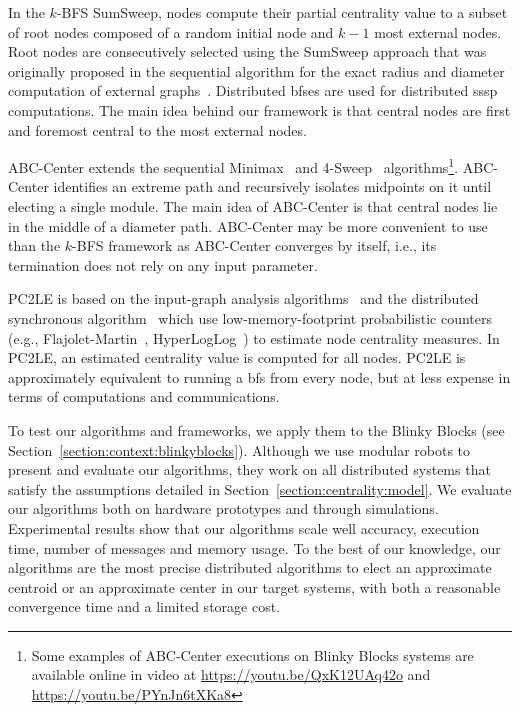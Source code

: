 In the $k$-BFS SumSweep, nodes compute their partial centrality value to a subset of root nodes composed of a random initial node and $k-1$ most external nodes. Root nodes are consecutively selected using the SumSweep approach that was originally proposed in the sequential algorithm for the exact radius and diameter computation of external graphs~\cite{borassi2014solvability}. Distributed \gls{bfses} are used for distributed \gls{sssp} computations. The main idea behind our framework is that central nodes are first and foremost central to the most external nodes. 

ABC-Center extends the sequential Minimax~\cite{handler1973minimax} and 4-Sweep~\cite{crescenzi2013computing} algorithms\footnote{Some examples of ABC-Center executions on Blinky Blocks systems are available online in video at \url{https://youtu.be/QxK12UAq42o} and \url{https://youtu.be/PYnJn6tXKa8}}. ABC-Center identifies an extreme path and recursively isolates midpoints on it until electing a single module. The main idea of ABC-Center is that central nodes lie in the middle of a diameter path. ABC-Center may be more convenient to use than the $k$-BFS framework as ABC-Center converges by itself, i.e., its termination does not rely on any input parameter.

PC2LE is based on the input-graph analysis algorithms~\cite{kang2011centralities,kang2011hadi} and the distributed synchronous algorithm~\cite{garin2012distributed} which use low-memory-footprint probabilistic counters (e.g., Flajolet-Martin~\cite{flajolet1985probabilistic}, HyperLogLog~\cite{flajolet2007hyperloglog}) to estimate node centrality measures. In PC2LE, an estimated centrality value is computed for all nodes. PC2LE is approximately equivalent to running a \gls{bfs} from every node, but at less expense in terms of computations and communications. 

To test our algorithms and frameworks, we apply them to the Blinky Blocks (see Section~\ref{section:context:blinkyblocks}). Although we use modular robots to present and evaluate our algorithms, they work on all distributed systems that satisfy the assumptions detailed in Section~\ref{section:centrality:model}. We evaluate our algorithms both on hardware prototypes and through simulations. Experimental results show that our algorithms scale well accuracy, execution time, number of messages and memory usage. To the best of our knowledge, our algorithms are the most precise distributed algorithms to elect an approximate centroid or an approximate center in our target systems, with both a reasonable convergence time and a limited storage cost.

